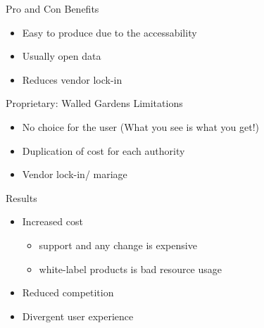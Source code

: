 
\begin{frame}{Pro and Con}
  Benefits
  \begin{itemize}
  \item Easy to produce due to the accessability
  \item Usually open data
  \item Reduces vendor lock-in
  \end{itemize}
\end{frame}

\begin{frame}{Proprietary: Walled Gardens}
  Limitations
  \begin{itemize}
  \item No choice for the user (What you see is what you get!)
  \item Duplication of cost for each authority
  \item Vendor lock-in/ mariage
  \end{itemize}
  Results
  \begin{itemize}
  \item Increased cost
    \begin{itemize}
    \item support and any change is expensive
    \item white-label products is bad resource usage
    \end{itemize}
  \item Reduced competition
  \item Divergent user experience
  \end{itemize}
\end{frame}

